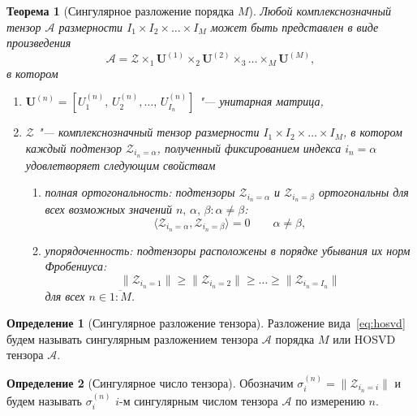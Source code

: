 \documentclass[specialist,
    substylefile = spbu_report.rtx,
    subf,href,colorlinks=true, 12pt]{disser}
\theoremstyle{plain}
\newtheorem{theorem}{Теорема}
\theoremstyle{definition}
\newtheorem{definition}{Определение}[section]
\theoremstyle{remark}
\begin{document}
    \begin{theorem}
    [Сингулярное разложение порядка $M$]
        Любой комплекснозначный тензор $\mathcal{A}$ размерности $I_1\times I_2 \times \ldots \times I_M$ может быть представлен
        в виде произведения
        \begin{equation}
            \mathcal{A} = \mathcal{Z} \times_1 \mathbf{U}^{(1)} \times_2 \mathbf{U}^{(2)} \times_3 \ldots \times_M \mathbf{U}^{(M)},\label{eq:hosvd}
        \end{equation}
        в котором
        \begin{enumerate}
            \item $\mathbf{U}^{(n)}=\left[U_1^{(n)},\, U_2^{(n)},\ldots,\, U_{I_n}^{(n)} \right]$ "--- унитарная матрица,
            \item $\mathcal{Z}$ "--- комплекснозначный тензор размерности $I_1\times I_2 \times \ldots \times I_M$, в котором
            каждый подтензор $\mathcal Z_{i_n=\alpha}$, полученный фиксированием индекса $i_n=\alpha$ удовлетворяет следующим свойствам
            \begin{enumerate}
                \item полная ортогональность: подтензоры $\mathcal Z_{i_n=\alpha}$ и $\mathcal Z_{i_n=\beta}$ ортогональны для всех возможных значений
                $n,\, \alpha,\, \beta: \alpha\ne\beta$:
                \[
                    \langle\mathcal Z_{i_n=\alpha},\mathcal Z_{i_n=\beta}\rangle=0 \qquad \alpha\ne\beta,
                \]
                \item упорядоченность: подтензоры расположены в порядке убывания их норм Фробениуса:
                \begin{equation}
                    \|\mathcal Z_{i_n=1}\|\geqslant\|\mathcal Z_{i_n=2}\| \geqslant \ldots \geqslant\|\mathcal Z_{i_n=I_n}\|\label{eq:order}
                \end{equation}
                для всех $n\in \overline{1:M}$.
            \end{enumerate}
        \end{enumerate}
    \end{theorem}
    \begin{definition}[Сингулярное разложение тензора]
        \label{def:hosvd}
        Разложение вида~\eqref{eq:hosvd} будем называть сингулярным разложением тензора $\mathcal{A}$ порядка $M$ или
        HOSVD тензора $\mathcal{A}$.
    \end{definition}
    \begin{definition}[Сингулярное число тензора]
        \label{def:singular-value}
        Обозначим $\sigma_i^{(n)}=\|\mathcal Z_{i_n=i}\|$ и будем называть $\sigma_i^{(n)}$ $i$-м сингулярным числом
        тензора $\mathcal A$ по измерению $n$.
    \end{definition}
\end{document}
